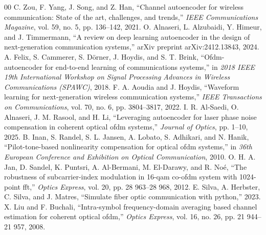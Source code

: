 \documentclass[conference]{IEEEtran}
\begin{document}
\begin{thebibliography}{00}
 C. Zou, F. Yang, J. Song, and Z. Han, ``Channel autoencoder for wireless communication: State of the art, challenges, and trends,'' \emph{IEEE Communications Magazine}, vol. 59, no. 5, pp. 136--142, 2021.
 O. Alnaseri, L. Alzubaidi, Y. Himeur, and J. Timmermann, ``A review on deep learning autoencoder in the design of next-generation communication systems,'' arXiv preprint arXiv:2412.13843, 2024.
 A. Felix, S. Cammerer, S. D\"{o}rner, J. Hoydis, and S. T. Brink, ``Ofdm-autoencoder for end-to-end learning of communications systems,'' in \emph{2018 IEEE 19th International Workshop on Signal Processing Advances in Wireless Communications (SPAWC)}, 2018.
 F. A. Aoudia and J. Hoydis, ``Waveform learning for next-generation wireless communication systems,'' \emph{IEEE Transactions on Communications}, vol. 70, no. 6, pp. 3804--3817, 2022.
 I. R. Al-Saedi, O. Alnaseri, J. M. Rasool, and H. Li, ``Leveraging autoencoder for laser phase noise compensation in coherent optical ofdm systems,'' \emph{Journal of Optics}, pp. 1--10, 2025.
 B. Inan, S. Randel, S. L. Jansen, A. Lobato, S. Adhikari, and N. Hanik, ``Pilot-tone-based nonlinearity compensation for optical ofdm systems,'' in \emph{36th European Conference and Exhibition on Optical Communication}, 2010.
 O. H. A. Jan, D. Sandel, K. Puntsri, A. Al-Bermani, M. El-Darawy, and R. No\'{e}, ``The robustness of subcarrier-index modulation in 16-qam co-ofdm system with 1024-point fft,'' \emph{Optics Express}, vol. 20, pp. 28 963--28 968, 2012.
 E. Silva, A. Herbster, C. Silva, and J. Matres, ``Simulate fiber optic communication with python,'' 2023.
 X. Liu and F. Buchali, ``Intra-symbol frequency-domain averaging based channel estimation for coherent optical ofdm,'' \emph{Optics Express}, vol. 16, no. 26, pp. 21 944--21 957, 2008.
\end{thebibliography}
\vspace{12pt}
\end{document}
